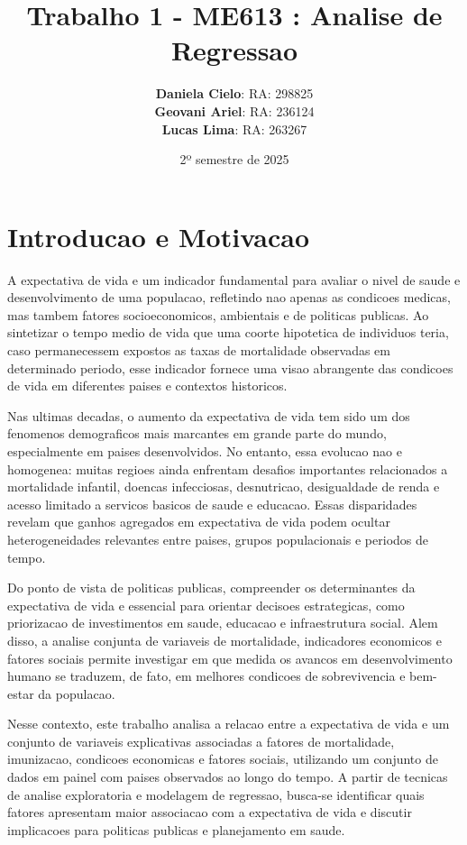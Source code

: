 \documentclass[
  12pt,
]{article}
\title{Trabalho 1 - ME613 : Analise de Regressao}
\author{\textbf{Daniela Cielo}: RA: 298825\\
\textbf{Geovani Ariel}: RA: 236124\\
\textbf{Lucas Lima}: RA: 263267}
\date{2º semestre de 2025}
\begin{document}
\maketitle

{
\setcounter{tocdepth}{2}
\tableofcontents
}
\section{Introducao e Motivacao}\label{introducao-e-motivacao}

A expectativa de vida e um indicador fundamental para avaliar o nivel de
saude e desenvolvimento de uma populacao, refletindo nao apenas as
condicoes medicas, mas tambem fatores socioeconomicos, ambientais e de
politicas publicas. Ao sintetizar o tempo medio de vida que uma coorte
hipotetica de individuos teria, caso permanecessem expostos as taxas de
mortalidade observadas em determinado periodo, esse indicador fornece
uma visao abrangente das condicoes de vida em diferentes paises e
contextos historicos.

Nas ultimas decadas, o aumento da expectativa de vida tem sido um dos
fenomenos demograficos mais marcantes em grande parte do mundo,
especialmente em paises desenvolvidos. No entanto, essa evolucao nao e
homogenea: muitas regioes ainda enfrentam desafios importantes
relacionados a mortalidade infantil, doencas infecciosas, desnutricao,
desigualdade de renda e acesso limitado a servicos basicos de saude e
educacao. Essas disparidades revelam que ganhos agregados em expectativa
de vida podem ocultar heterogeneidades relevantes entre paises, grupos
populacionais e periodos de tempo.

Do ponto de vista de politicas publicas, compreender os determinantes da
expectativa de vida e essencial para orientar decisoes estrategicas,
como priorizacao de investimentos em saude, educacao e infraestrutura
social. Alem disso, a analise conjunta de variaveis de mortalidade,
indicadores economicos e fatores sociais permite investigar em que
medida os avancos em desenvolvimento humano se traduzem, de fato, em
melhores condicoes de sobrevivencia e bem-estar da populacao.

Nesse contexto, este trabalho analisa a relacao entre a expectativa de
vida e um conjunto de variaveis explicativas associadas a fatores de
mortalidade, imunizacao, condicoes economicas e fatores sociais,
utilizando um conjunto de dados em painel com paises observados ao longo
do tempo. A partir de tecnicas de analise exploratoria e modelagem de
regressao, busca-se identificar quais fatores apresentam maior
associacao com a expectativa de vida e discutir implicacoes para
politicas publicas e planejamento em saude.
\end{document}
